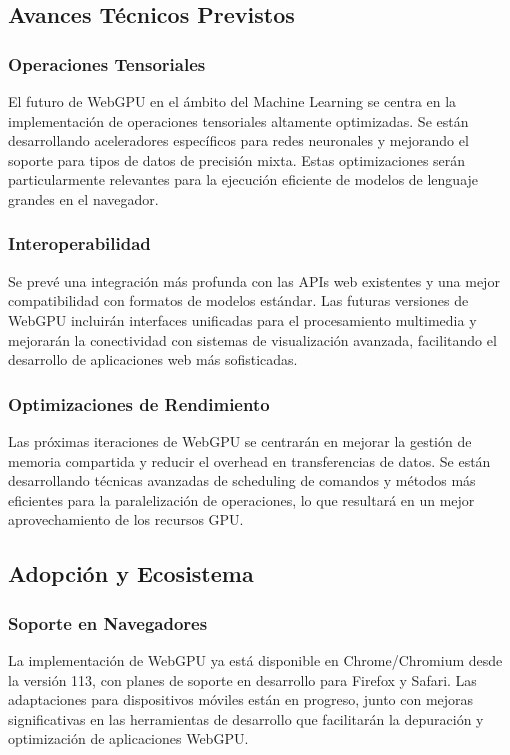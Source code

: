 \subsection{Avances Técnicos Previstos}
\label{subsec:technical-advances}

\subsubsection{Operaciones Tensoriales}
El futuro de WebGPU en el ámbito del Machine Learning se centra en la implementación de operaciones tensoriales altamente optimizadas. Se están desarrollando aceleradores específicos para redes neuronales y mejorando el soporte para tipos de datos de precisión mixta. Estas optimizaciones serán particularmente relevantes para la ejecución eficiente de modelos de lenguaje grandes en el navegador.

\subsubsection{Interoperabilidad}
Se prevé una integración más profunda con las APIs web existentes y una mejor compatibilidad con formatos de modelos estándar. Las futuras versiones de WebGPU incluirán interfaces unificadas para el procesamiento multimedia y mejorarán la conectividad con sistemas de visualización avanzada, facilitando el desarrollo de aplicaciones web más sofisticadas.

\subsubsection{Optimizaciones de Rendimiento}
Las próximas iteraciones de WebGPU se centrarán en mejorar la gestión de memoria compartida y reducir el overhead en transferencias de datos. Se están desarrollando técnicas avanzadas de scheduling de comandos y métodos más eficientes para la paralelización de operaciones, lo que resultará en un mejor aprovechamiento de los recursos GPU.

\subsection{Adopción y Ecosistema}
\label{subsec:adoption-ecosystem}

\subsubsection{Soporte en Navegadores}
La implementación de WebGPU ya está disponible en Chrome/Chromium desde la versión 113, con planes de soporte en desarrollo para Firefox y Safari. Las adaptaciones para dispositivos móviles están en progreso, junto con mejoras significativas en las herramientas de desarrollo que facilitarán la depuración y optimización de aplicaciones WebGPU.

